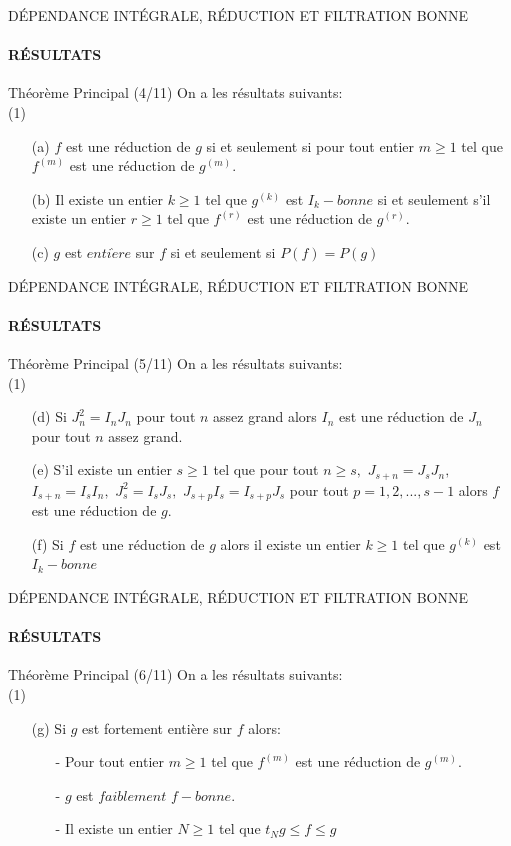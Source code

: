 \documentclass[11pt,a4paper]{beamer}
\begin{document}
\begin{frame}{DÉPENDANCE INTÉGRALE, RÉDUCTION ET FILTRATION BONNE}
	\framesubtitle{RÉSULTATS}
	\begin{block}{Théorème Principal (4/11)}
		On a les résultats suivants:\\
		(1)
		\begin{enumerate}
			\item[(a)] $f$ est une réduction de $g$ si et seulement si pour tout entier $m\geq 1$ tel que $f^{(m)}$ est une réduction de $g^{(m)}.$ 
			\item[(b)] Il existe un entier $k\geq 1$ tel que $g^{(k)}$ est $I_{k}-bonne$ si et seulement s'il existe un entier $r\geq 1$ tel que $f^{(r)}$ est une réduction de $g^{(r)}.$
			\item[(c)] $g$ est $enti\grave{e}re$ sur $f$ si et seulement si $P(f)=P(g)$
		\end{enumerate}
	\end{block}
\end{frame}

\begin{frame}{DÉPENDANCE INTÉGRALE, RÉDUCTION ET FILTRATION BONNE}
	\framesubtitle{RÉSULTATS}
	\begin{block}{Théorème Principal (5/11)}
		On a les résultats suivants:\\
		(1)
		\begin{enumerate}
			\item[(d)]Si $J_{n}^{2}=I_{n}J_{n}$ pour tout $n$ assez grand alors $I_{n}$ est une réduction de $J_{n}$ pour tout $n$ assez grand. 
			\item[(e)]S'il existe un entier $s\geq 1$ tel que pour tout $n\geq s,$ $J_{s+n}=J_{s}J_{n},$ $I_{s+n}=I_{s}I_{n},$ $J_{s}^{2}=I_{s}J_{s},$ $J_{s+p}I_{s}=I_{s+p}J_{s}$ pour tout $p=1,2,...,s-1$ alors $f$ est une réduction de $g.$
			\item[(f)]Si $f$ est une réduction de $g$ alors il existe un entier $k\geq 1$ tel que $g^{(k)}$ est $I_{k}-bonne$
		\end{enumerate}
	\end{block}
\end{frame}

\begin{frame}{DÉPENDANCE INTÉGRALE, RÉDUCTION ET FILTRATION BONNE}
	\framesubtitle{RÉSULTATS}
	\begin{block}{Théorème Principal (6/11)}
		On a les résultats suivants:\\
		(1)
		\begin{enumerate}
			\item[(g)] Si $g$ est fortement entière sur $f$ alors:
			\begin{enumerate}
				\item[-] Pour tout entier $m\geq 1$ tel que $f^{(m)}$ est une réduction de $g^{(m)}.$
				\item[-] $g$ est $faiblement$ $f-bonne.$
				\item[-] Il existe un entier $N\geq 1$ tel que $t_{N}g\leq f\leq g$
			\end{enumerate}
		\end{enumerate}
	\end{block}
\end{frame}
\end{document}
